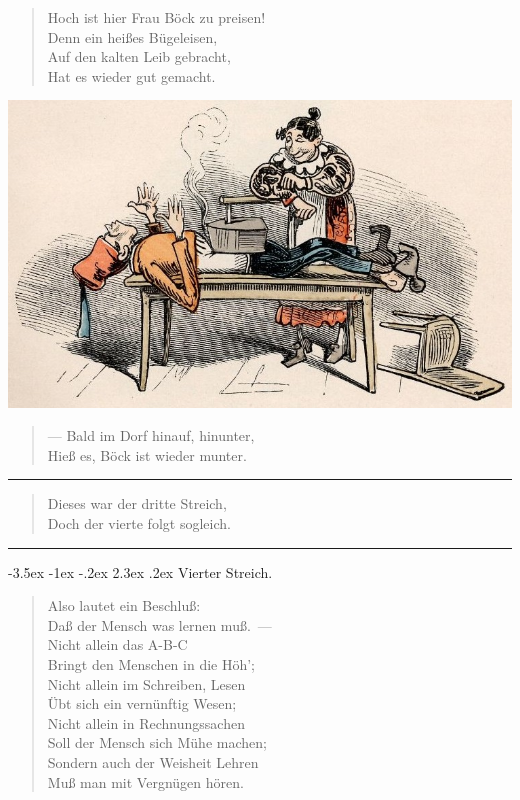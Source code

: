 \documentclass[a4paper,12pt]{article}
\makeatletter
\renewcommand\section{\@startsection {section}{1}{\z@}%
                                   {-3.5ex \@plus -1ex \@minus -.2ex}%
                                   {2.3ex \@plus.2ex}%
                                   {\centering\normalfont\LARGE\bfseries}}
\makeatother
\begin{document}
\begin{verse}
Hoch ist hier Frau Böck zu preisen!\\{}
Denn ein heißes Bügeleisen,\\{}
Auf den kalten Leib gebracht,\\{}
Hat es wieder gut gemacht.
\end{verse}



\begin{center}\includegraphics[scale=.7, alt={... mit dem Bügeleisen}]{images/3-13.jpg}\end{center}



\begin{verse}
— Bald im Dorf hinauf, hinunter,\\{}
Hieß es, Böck ist wieder munter.
\end{verse}


\hrule


\begin{verse}
Dieses war der dritte Streich,\\{}
Doch der vierte folgt sogleich.
\end{verse}


\hrule


\clearpage
\section{Vierter Streich.\label{Vierter_Streich}}


\begin{verse}
Also lautet ein Beschluß:\\{}
Daß der Mensch was lernen muß.~—\\{}
Nicht allein das A-B-C\\{}
Bringt den Menschen in die Höh';\\{}
Nicht allein im Schreiben, Lesen\\{}
Übt sich ein vernünftig Wesen;\\{}
Nicht allein in Rechnungssachen\\{}
Soll der Mensch sich Mühe machen;\\{}
Sondern auch der Weisheit Lehren\\{}
Muß man mit Vergnügen hören.
\end{verse}
\end{document}
